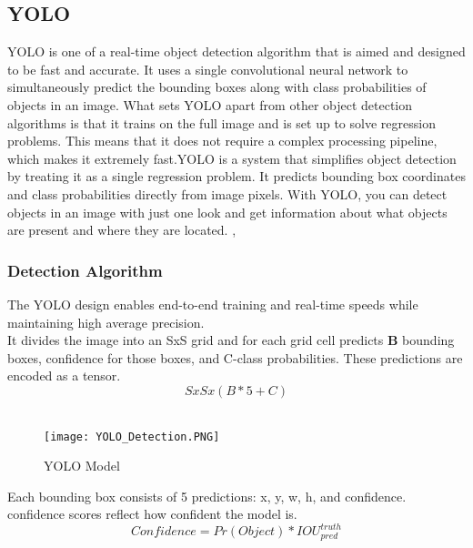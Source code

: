 \subsection{YOLO}
YOLO is one of a real-time object detection algorithm that is aimed and designed to be fast and accurate. It uses a single convolutional neural network to simultaneously predict the bounding boxes along with class probabilities of objects in an image. What sets YOLO apart from other object detection algorithms is that it trains on the full image and is set up to solve regression problems. This means that it does not require a complex processing pipeline, which makes it extremely fast.YOLO is a system that simplifies object detection by treating it as a single regression problem. It predicts bounding box coordinates and class probabilities directly from image pixels. With YOLO, you can detect objects in an image with just one look and get information about what objects are present and where they are located. \cite{redmon2016you}, \cite{ansari2020building}

\subsubsection{Detection Algorithm}
The YOLO design enables end-to-end training and real-time speeds while maintaining high average precision. \\
It divides the image into an SxS grid and for each
grid cell predicts \textbf{B} bounding boxes, confidence for those boxes,
and C-class probabilities. These predictions are encoded as a tensor.
\[
S x S x (B*5 + C)
\]
\\
\begin{figure}[H]
    \centering
    \texttt{[image: YOLO\_Detection.PNG]}
    \caption{YOLO Model \cite{redmon2016you}}
    \label{fig:YoloV1_Model}
\end{figure}

Each bounding box consists of 5 predictions: x, y, w, h,
and confidence. confidence scores reflect how confident the model is.
\[
Confidence =Pr(Object)*IOU_{pred}^{truth}
\]
